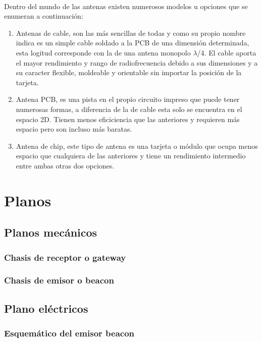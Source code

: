 \documentclass[a4paper ,12pt, onecolumn]{article}
\begin{document}
            \paragraph{}
            Dentro del mundo de las antenas existen numerosos modelos u opciones que se enumeran a continuación:
            \begin{enumerate}
                \item Antenas de cable, son las más sencillas de todas y como su propio nombre indica es un simple cable soldado a la PCB de una dimensión determinada, esta logitud corresponde con la de una antena monopolo $\lambda$/4. El cable aporta el mayor rendimiento y rango de radiofrecuencia debido a sus dimensiones y a su caracter flexible, moldeable y orientable sin importar  la posición de la tarjeta.
                \item Antena PCB, es una pista en el propio circuito impreso que puede tener numerosas formas, a diferencia de la de cable esta solo se encuentra en el espacio 2D. Tienen menos eficiciencia que las anteriores y requieren más espacio pero son incluso más baratas.
                \item Antena de chip, este tipo de antena es una tarjeta o módulo que ocupa menos espacio que cualquiera de las anteriores y tiene un rendimiento intermedio entre ambas otras dos opciones.
            \end{enumerate}
\section{Planos}
    \subsection{Planos mecánicos}
        \subsubsection{Chasis de receptor o gateway}
        \subsubsection{Chasis de emisor o beacon}
    \subsection{Plano eléctricos}
        \subsubsection{Esquemático del emisor beacon}
\end{document}

